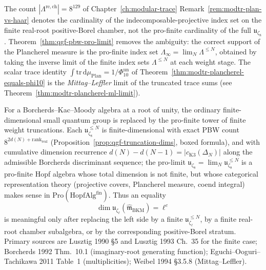 \begin{remark}
\label{rem:qgf-8-to-129-interpretation}
The count \(|\Lambda^{\mathrm{re,ch}}| = 8^{129}\) of
Chapter~\ref{ch:modular-trace}
Remark~\ref{rem:modtr-plan-vs-haar} denotes the cardinality of
the indecomposable-projective index set on the finite real-root
positive-Borel chamber, not the
pro-finite cardinality of the full $\mathfrak u_{\zeta_8}$.
Theorem~\ref{thm:qgf-pbw-pro-limit} removes the ambiguity:
the correct support of the Plancherel measure is the pro-finite index
set $\Lambda_\infty = \lim_N\Lambda^{\leq N}$, obtained by taking the
inverse limit of the finite index sets $\Lambda^{\leq N}$ at each
weight stage. The scalar trace identity
$\int\mathrm{tr}\,\mathrm d\mu_{\mathrm{Plan}} = 1/\Phi_{10}^{\mathrm{un}}$
of Theorem~\ref{thm:modtr-plancherel-equals-phi10} is the
\emph{Mittag--Leffler} limit of the truncated trace sums
(see Theorem~\ref{thm:modtr-plancherel-ml-limit}).
\end{remark}

\begin{remark}
\label{rem:qgf-prolimit-finitedim}
For a Borcherds--Kac--Moody algebra at a root of unity, the ordinary
finite-dimensional small quantum group is replaced by the pro-finite
tower of finite weight truncations. Each
\(\mathfrak u_{\zeta_8}^{\leq N}\) is finite-dimensional with exact PBW
count
$8^{2d(N)+\mathrm{rank}_{\mathrm{real}}}$
(Proposition~\ref{prop:qgf-truncation-dims},
boxed formula), and with cumulative dimension recurrence
$d(N) - d(N-1) = |c_{\mathrm{K3}}(\Delta_N)|$ along the admissible
Borcherds discriminant sequence; the pro-limit
$\mathfrak u_{\zeta_8}=\lim_N\mathfrak u_{\zeta_8}^{\leq N}$ is a
pro-finite Hopf algebra whose total dimension is not finite, but whose
categorical representation theory (projective covers, Plancherel
measure, coend integral) makes sense in $\mathrm{Pro}(\mathrm{HopfAlg}^
{\mathrm{fin}})$.
Thus an equality
\[
\dim\mathfrak u_{\zeta_\ell}(\widehat{\mathfrak m}_{\mathrm{BKM}})
= \ell^c
\]
is meaningful only after replacing the left side by a finite
\(\mathfrak u_{\zeta_\ell}^{\leq N}\), by a finite real-root chamber
subalgebra, or by the corresponding positive-Borel stratum.
Primary sources are Lusztig 1990 \S5 and Lusztig 1993 Ch.~35 for the
finite case;
Borcherds 1992 Thm.~10.1 (imaginary-root generating function);
Eguchi--Ooguri--Tachikawa 2011 Table~1 (multiplicities);
Weibel 1994 \S3.5.8 (Mittag--Leffler).
\end{remark}

